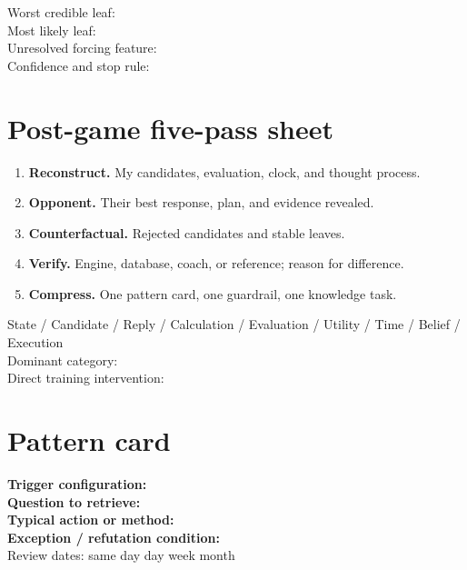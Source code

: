 \begin{tcolorbox}[colback=white,colframe=Navy,title={Comparison},fonttitle=\sffamily\bfseries,height=2.1in]
Worst credible leaf:\hrulefill\\[.9em]
Most likely leaf:\hrulefill\\[.9em]
Unresolved forcing feature:\hrulefill\\[.9em]
Confidence and stop rule:\hrulefill
\end{tcolorbox}

\section{Post-game five-pass sheet}
\begin{enumerate}[label=\textbf{Pass \arabic*:},leftmargin=5.2em]
\item \textbf{Reconstruct.} My candidates, evaluation, clock, and thought process.
\item \textbf{Opponent.} Their best response, plan, and evidence revealed.
\item \textbf{Counterfactual.} Rejected candidates and stable leaves.
\item \textbf{Verify.} Engine, database, coach, or reference; reason for difference.
\item \textbf{Compress.} One pattern card, one guardrail, one knowledge task.
\end{enumerate}

\begin{tcolorbox}[colback=white,colframe=Coral,title={Error classification},fonttitle=\sffamily\bfseries,height=2.0in]
State / Candidate / Reply / Calculation / Evaluation / Utility / Time / Belief / Execution\\[1em]
Dominant category:\hrulefill\\[1em]
Direct training intervention:\hrulefill
\end{tcolorbox}

\section{Pattern card}
\begin{tcolorbox}[colback=white,colframe=Gold,title={Reusable pattern},fonttitle=\sffamily\bfseries,height=2.7in]
\textbf{Trigger configuration:}\hrulefill\\[1em]
\textbf{Question to retrieve:}\hrulefill\\[1em]
\textbf{Typical action or method:}\hrulefill\\[1em]
\textbf{Exception / refutation condition:}\hrulefill\\[1em]
Review dates: same day day week month
\end{tcolorbox}

